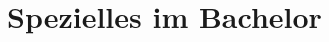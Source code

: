 \documentclass[]{papertex}
\begin{document}
	\section{Spezielles im Bachelor}
		\label{bachelor}
		
		
		

\end{document}
